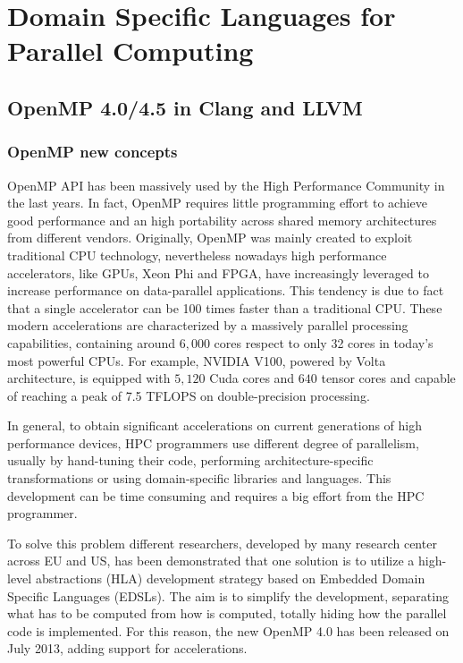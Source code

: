 \chapter{Domain Specific Languages for Parallel Computing}


\section{OpenMP 4.0/4.5 in Clang and LLVM}


\subsection{OpenMP new concepts}

OpenMP API has been massively used by the High Performance Community in the last years. In fact, OpenMP requires little programming effort to achieve good performance and an high portability across shared memory architectures from different vendors. Originally, OpenMP was mainly created to exploit traditional CPU technology, nevertheless nowadays high performance accelerators, like GPUs, Xeon Phi and FPGA, have increasingly leveraged to increase performance on data-parallel applications. This tendency is due to fact that a single accelerator can be 100 times faster than a traditional CPU. These modern accelerations are characterized by a massively parallel processing capabilities, containing around $6,000$ cores respect to only 32 cores in today’s most powerful CPUs. For example, NVIDIA V100, powered by Volta architecture, is equipped with $5,120$ Cuda cores and $640$ tensor cores and capable of reaching a peak of 7.5 TFLOPS on double-precision processing. 

In general, to obtain significant accelerations on current generations of high performance devices, HPC programmers use different degree of parallelism, usually by hand-tuning their code, performing architecture-specific transformations or using domain-specific libraries and languages. This development can be time consuming and requires a big effort from the HPC programmer.

To solve this problem different researchers, developed by many research center across EU and US, has been demonstrated that one solution is to utilize a high-level abstractions (HLA) development strategy based on Embedded Domain Specific Languages (EDSLs). The aim is to simplify the development, separating what has to be computed from how is computed, totally hiding how the parallel code is implemented. 
For this reason, the new OpenMP 4.0 has been released on July 2013, adding support for accelerations. 

